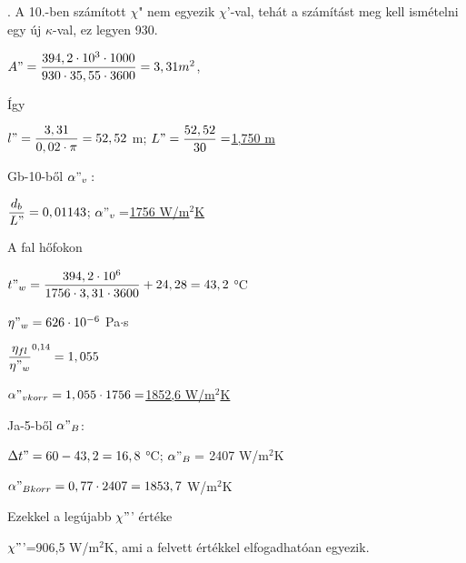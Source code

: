 \vspace{5mm}
. A 10.-ben számított $\chi$" nem egyezik $\chi$’-val, tehát a számítást meg kell ismételni egy új $\kappa$-val, ez legyen 930.

\vspace{5mm}
$A"=\dfrac{394,2\cdot10^{3}\cdot1000}{930\cdot35,55\cdot3600}=3,31 m^{2}$,

\vspace{5mm}
\noindent
Így 

$l"=\dfrac{3,31}{0,02\cdot\pi}=52,52$ m; $L"=\dfrac{52,52}{30}=$\underline{1,750 m}

\vspace{5mm}
\noindent
Gb-10-ből $\alpha"_v:$

\vspace{5mm}
$\dfrac{d_b}{L"}=0,01143$; $\alpha"_v=$\underline{1756 W/m$^2$K}

\vspace{5mm}
\noindent
A fal hőfokon

\vspace{5mm}
$t"_w=\dfrac{394,2\cdot10^6}{1756\cdot3,31\cdot3600}+24,28=43,2$ °C

\vspace{5mm}
$\eta"_w=626\cdot10^{-6}$ Pa$\cdot$s

\vspace{5mm}
$\dfrac{\eta_{fl}}{\eta"_{w}}^{0,14}=1,055$

\vspace{5mm}
$\alpha"_{vkorr}=1,055\cdot1756=$\underline{1852,6 W/m$^2$K}

\vspace{5mm}
Ja-5-ből $\alpha"_B$:

\vspace{5mm}
$\Delta t"=60-43,2=16,8$ °C; $\alpha"_B=$ 2407 W/m$^2$K

\vspace{5mm}
$\alpha"_{Bkorr}=0,77\cdot2407=1853,7$ W/m$^2$K

\vspace{5mm}
Ezekkel a legújabb $\chi"$' értéke

\vspace{5mm}
\noindent
$\chi"$'=906,5 W/m$^2$K, ami a felvett értékkel elfogadhatóan egyezik. 



